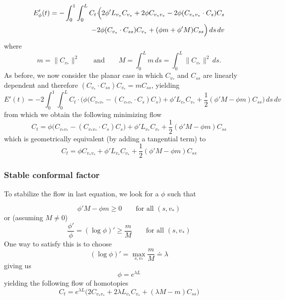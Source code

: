\documentclass[twoside,a4paper,english]{article}
\def\v{{v_*}}
\begin{document}
\begin{eqnarray*}
  E_\phi'(t) =
      -\int_0^1\int_0^L
        C_t\cdot
        \hspace{-2em}
        && \Big(
            2\phi'L_{\v} C_{\v}
           +2\phi C_{\v\v}-2\phi(C_{\v\v}\cdot C_s)C_s \\
        && -2\phi(C_{\v}\cdot C_{ss})C_{\v}
           +(\phi m+\phi'M)C_{ss}
          \Big)
      \,ds\,dv
\end{eqnarray*}
where
\[
  m=\|C_\v\|^2 \qquad\mbox{and}\qquad
  M=\int_0^L m \,ds = \int_0^L \|C_\v\|^2 \,ds.
\]
As before, we now consider the planar case in
which $C_{\v}$ and $C_{ss}$ are linearly dependent
and therefore $(C_{\v}\cdot C_{ss})C_{\v}=mC_{ss}$,
yielding
\begin{equation}
E'(t)= -2
   \int_0^1\int_0^L
    \!C_t\cdot\Big(
      \phi\big(C_{\v\v}\!\!-(C_{\v\v}\!\!\cdot C_s)C_s\big)
     +\phi'L_{\v} C_{\v}
     +\frac{1}{2}(\phi'M-\phi m)C_{ss}
    \Big)
  \,ds\,dv
\end{equation}
from which we obtain the following minimizing flow
\[ C_t =  
      \phi\big(C_{\v\v}-(C_{\v\v}\cdot C_s)C_s\big)
     +\phi'L_{\v} C_{\v}
     +\frac{1}{2}(\phi'M-\phi m)C_{ss}
\]
which is geometrically equivalent (by adding a tangential
term) to
\begin{equation}\label{eq:flowConf}
   C_t =  
      \phi C_{\v\v}
     +\phi'L_{\v} C_{\v}
     +\frac{1}{2}(\phi'M-\phi m)C_{ss}
\end{equation}

\subsubsection{Stable conformal factor}

To stabilize the flow in last equation, we look for a $\phi$ such that

\begin{equation}\label{eq: phi stab}
  \phi'M-\phi m \ge 0 \qquad\mbox{for all }(s,\v)
\end{equation}
or (assuming $M\ne 0$)
\begin{equation}
  \frac{\phi'}{\phi}=(\log\phi)'
  \ge \frac{m}{M} \qquad\mbox{for all }(s,\v)
\end{equation}
One way to satisfy this is to choose
\begin{equation}\label{eq: lambda stab}
 (\log\phi)'=\max_{s,\v}\frac{m}{M}\doteq\lambda
\end{equation}
giving us
\begin{equation}
 \phi=e^{\lambda L}
\end{equation}
yielding the following flow of homotopies
\begin{equation}
 C_t= e^{\lambda L}\Big( 
        2C_{\v\v}+2\lambda L_{\v}C_{\v}+(\lambda M-m)C_{ss}
      \Big)
\end{equation}
\end{document}
